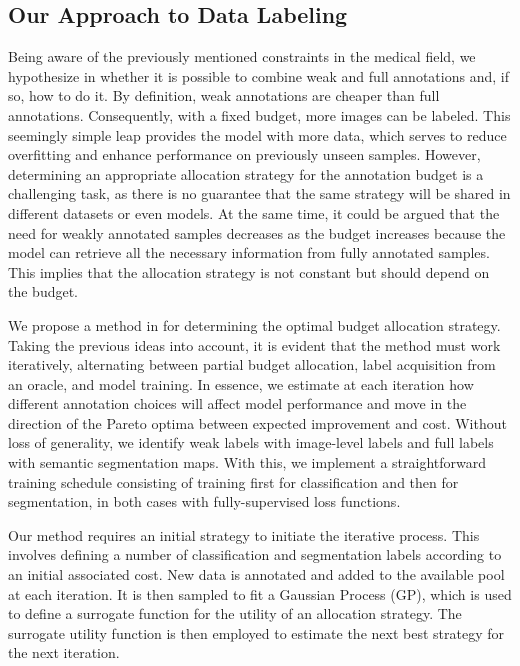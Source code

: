 \subsection{Our Approach to Data Labeling}
Being aware of the previously mentioned constraints in the medical field, we hypothesize in  whether it is possible to combine weak and full annotations and, if so, how to do it. By definition, weak annotations are cheaper than full annotations. Consequently, with a fixed budget, more images can be labeled. This seemingly simple leap provides the model with more data, which serves to reduce overfitting and enhance performance on previously unseen samples. However, determining an appropriate allocation strategy for the annotation budget is a challenging task, as there is no guarantee that the same strategy will be shared in different datasets or even models. At the same time, it could be argued that the need for weakly annotated samples decreases as the budget increases because the model can retrieve all the necessary information from fully annotated samples. This implies that the allocation strategy is not constant but should depend on the budget.

We propose a method in  for determining the optimal budget allocation strategy. Taking the previous ideas into account, it is evident that the method must work iteratively, alternating between partial budget allocation, label acquisition from an oracle, and model training. In essence, we estimate at each iteration how different annotation choices will affect model performance and move in the direction of the Pareto optima between expected improvement and cost. Without loss of generality, we identify weak labels with image-level labels and full labels with semantic segmentation maps. With this, we implement a straightforward training schedule consisting of training first for classification and then for segmentation, in both cases with fully-supervised loss functions. 

Our method requires an initial strategy to initiate the iterative process. This involves defining a number of classification and segmentation labels according to an initial associated cost. New data is annotated and added to the available pool at each iteration. It is then sampled to fit a Gaussian Process (GP), which is used to define a surrogate function for the utility of an allocation strategy. The surrogate utility function is then employed to estimate the next best strategy for the next iteration.

